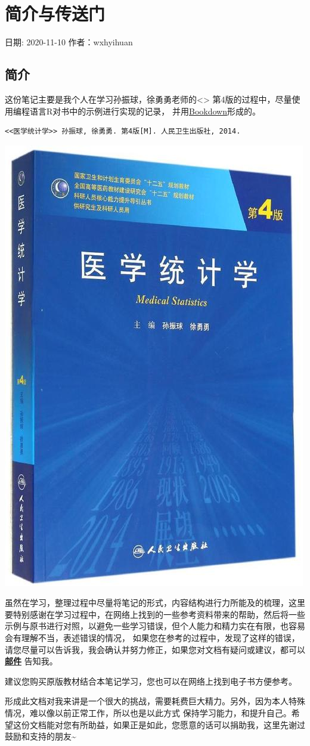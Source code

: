 \documentclass[
]{article}
\author{}
\date{\vspace{-2.5em}}
\begin{document}
{
\setcounter{tocdepth}{2}
\tableofcontents
}
\hypertarget{ux7b80ux4ecbux4e0eux4f20ux9001ux95e8}{%
\section{简介与传送门}\label{ux7b80ux4ecbux4e0eux4f20ux9001ux95e8}}

日期: 2020-11-10
作者：wxhyihuan

\hypertarget{ux7b80ux4ecb}{%
\subsection{简介}\label{ux7b80ux4ecb}}

这份笔记主要是我个人在学习孙振球，徐勇勇老师的\textless{}\textgreater{} 第4版的过程中，尽量使用编程语言R对书中的示例进行实现的记录，
并用\href{https://github.com/rstudio/bookdown}{Bookdown}形成的。

\begin{verbatim}
<<医学统计学>> 孙振球, 徐勇勇. 第4版[M]. 人民卫生出版社, 2014.
\end{verbatim}

\begin{center}\includegraphics[width=0.25\linewidth]{image/Ms_logo} \end{center}

虽然在学习，整理过程中尽量将笔记的形式，内容结构进行力所能及的梳理，这里要特别感谢在学习过程中，在网络上找到的一些参考资料带来的帮助，然后将一些
示例与原书进行对照，以避免一些学习错误，但个人能力和精力实在有限，也容易会有理解不当，表述错误的情况，
如果您在参考的过程中，发现了这样的错误，请您尽量可以告诉我，我会确认并努力修正，如果您对文档有疑问或建议，都可以 \textbf{\href{mailto:wxh244295043@gamil.com}{邮件}} 告知我。

建议您购买原版教材结合本笔记学习，您也可以在网络上找到电子书方便参考。

形成此文档对我来讲是一个很大的挑战，需要耗费巨大精力。另外，因为本人特殊情况，难以像以前正常工作，所以也是以此方式
保持学习能力，和提升自己。希望这份文档能对您有所助益，如果正是如此，您愿意的话可以捐助我，这里先谢过鼓励和支持的朋友\textasciitilde{}
\end{document}

